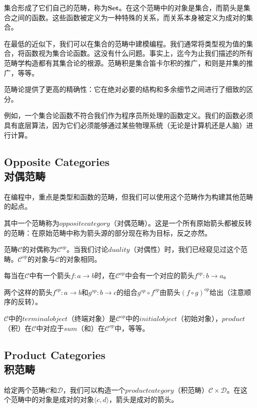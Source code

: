 \documentclass[DaoFP]{subfiles}
\begin{document}
    集合形成了它们自己的范畴，称为$\mathbf{Set}$。在这个范畴中的对象是集合，而箭头是集合之间的函数。这些函数被定义为一种特殊的关系，而关系本身被定义为成对的集合。

    在最低的近似下，我们可以在集合的范畴中建模编程。我们通常将类型视为值的集合，将函数视为集合论函数。这没有什么问题。事实上，迄今为止我们描述的所有范畴学构造都有其集合论的根源。范畴积是集合笛卡尔积的推广，和则是并集的推广，等等。

    范畴论提供了更高的精确性：它在绝对必要的结构和多余细节之间进行了细致的区分。

    例如，一个集合论函数不符合我们作为程序员所处理的函数定义。我们的函数必须具有底层算法，因为它们必须能够通过某些物理系统（无论是计算机还是人脑）进行计算。

    \subsection{Opposite Categories\\对偶范畴}

    在编程中，重点是类型和函数的范畴，但我们可以使用这个范畴作为构建其他范畴的起点。

    其中一个范畴称为$opposite category$（对偶范畴）。这是一个所有原始箭头都被反转的范畴：在原始范畴中称为箭头源的部分现在称为目标，反之亦然。

    范畴$\mathcal{C}$的对偶称为$\mathcal{C}^{op}$。当我们讨论$duality$（对偶性）时，我们已经窥见过这个范畴。$\mathcal{C}^{op}$的对象与$\mathcal{C}$的对象相同。

    每当在$\mathcal{C}$中有一个箭头$f \colon a \to b$时，在$\mathcal{C}^{op}$中会有一个对应的箭头$f^{op} \colon b \to a$。

    两个这样的箭头$f^{op} \colon a \to b$和$g^{op} \colon b \to c$的组合$g^{op} \circ f^{op}$由箭头$(f \circ g)^{op}$给出（注意顺序的反转）。

    $\mathcal{C}$中的$terminal object$（终端对象）是$\mathcal{C}^{op}$中的$initial object$（初始对象），$product$（积）在$\mathcal{C}$中对应于$sum$（和）在$\mathcal{C}^{op}$中，等等。

    \subsection{Product Categories\\积范畴}

    给定两个范畴$\mathcal{C}$和$\mathcal{D}$，我们可以构造一个$product category$（积范畴）$\mathcal{C} \times \mathcal{D}$。在这个范畴中的对象是成对的对象$\langle c, d \rangle $，箭头是成对的箭头。
\end{document}
